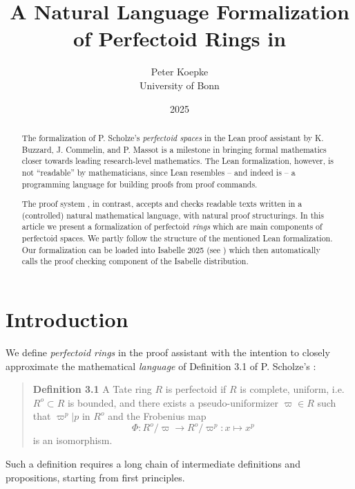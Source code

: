 \documentclass[11pt]{article}
\title{A Natural Language Formalization of Perfectoid Rings in \Naproche}
\author{Peter Koepke\\
University of Bonn}
\date{2025}
\begin{document}
\maketitle

\begin{abstract}
   The formalization of P. Scholze's \emph{perfectoid spaces} 
   \cite{Scholze2012}
   in the Lean proof assistant \cite{Lean}
   by K. Buzzard, J. Commelin, and P. Massot \cite{BuzzardCommelinMassot2019} is a milestone in bringing 
   formal mathematics closer towards leading research-level mathematics. 
   The Lean formalization, however, is not ``readable'' by mathematicians, 
   since Lean resembles -- and indeed is -- a programming language 
   for building proofs from proof commands.

   The \Naproche proof system
   \cite{DeLonKoepkeLorenzenMartiSchuetzWenzel2021}, in contrast, accepts and checks 
   readable texts written in a 
   (controlled) natural mathematical language, with natural proof structurings. 
   In this article we present a \Naproche formalization of perfectoid \emph{rings} 
   which are main components of perfectoid spaces. We partly follow the structure 
   of the mentioned Lean formalization. Our formalization can be loaded 
   into Isabelle 2025
   (see \cite{Isabelle}) which then automatically calls the \Naproche proof checking 
   component of the Isabelle distribution.
\end{abstract}

\newpage
\tableofcontents
\newpage

\section*{Introduction}

We define \textit{perfectoid rings} in the proof assistant \Naproche \cite{DeLonKoepkeLorenzenMartiSchuetzWenzel2021} 
with the intention to closely approximate the mathematical 
\textit{language} 
of Definition 3.1 of
P. Scholze's \cite{Scholze2022}:
\begin{quote}
\textbf{Definition 3.1} A Tate ring $R$ is perfectoid if $R$ is complete, uniform,
i.e. $R^o \subset R$ is bounded, and there exists a
pseudo-uniformizer $\varpi \in R$ such that $\varpi^p | p$ in $R^o$ and the
Frobenius map
\[\Phi: R^o/\varpi \rightarrow R^o/\varpi^p : x \mapsto x^p\]
is an isomorphism.
\end{quote}
Such a definition requires a long chain of intermediate definitions
and propositions, starting from first principles.
\end{document}
